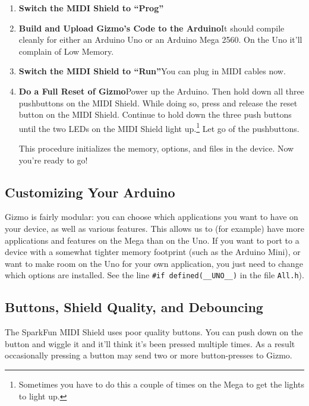 \documentclass{article}
\begin{document}
\begin{enumerate}
\item {\bf Switch the MIDI Shield to ``Prog''}

\item {\bf Build and Upload Gizmo's Code to the Arduino}\quad  It should compile cleanly for either an Arduino Uno or an Arduino Mega 2560.  On the Uno it'll complain of Low Memory.

\item {\bf Switch the MIDI Shield to ``Run''}\quad  You can plug in MIDI cables now.

\item {\bf Do a Full Reset of Gizmo}\quad Power up the Arduino.  Then hold down all three pushbuttons on the MIDI Shield.  While doing so, press and release the reset button on the MIDI Shield.  Continue to hold down the three push buttons until the two LEDs on the MIDI Shield light up.\footnote{Sometimes you have to do this a couple of times on the Mega to get the lights to light up.}  Let go of the pushbuttons.  

This procedure initializes the memory, options, and files in the device.  Now you're ready to go!

\end{enumerate}

\subsection{Customizing Your Arduino}

Gizmo is fairly modular: you can choose which applications you want to have on your device, as well as various features.  This allows us to (for example) have more applications and features on the Mega than on the Uno.  If you want to port to a device with a somewhat tighter memory footprint (such as the Arduino Mini), or want to make room on the Uno for your own application, you just need to change which options are installed.  See the line {\tt \#if defined(\_\_UNO\_\_)} in the file \texttt{All.h}).

\subsection{Buttons, Shield Quality, and Debouncing}
\label{debouncing}

The SparkFun MIDI Shield uses poor quality buttons.  You can push down on the button and wiggle it and it'll think it's been pressed multiple times.  As a result occasionally pressing a button may send two or more button-presses to Gizmo.
\end{document}
